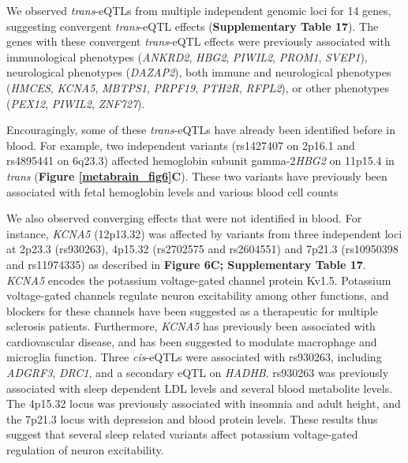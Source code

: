 We observed \textit{trans}-eQTLs from multiple independent genomic loci for 14 genes, suggesting convergent \textit{trans}-eQTL effects (\textbf{Supplementary Table 17}). The genes with these convergent \textit{trans}-eQTL effects were previously associated with immunological phenotypes (\textit{ANKRD2}, \textit{HBG2}, \textit{PIWIL2}, \textit{PROM1}, \textit{SVEP1}), neurological phenotypes (\textit{DAZAP2}), both immune and neurological phenotypes (\textit{HMCES}, \textit{KCNA5}, \textit{MBTPS1}, \textit{PRPF19}, \textit{PTH2R}, \textit{RFPL2}), or other phenotypes (\textit{PEX12}, \textit{PIWIL2}, \textit{ZNF727}). 

Encouragingly, some of these \textit{trans}-eQTLs have already been identified before in blood. For example, two independent variants (rs1427407 on 2p16.1 and rs4895441 on 6q23.3) affected hemoglobin subunit gamma-2\textit{HBG2} on 11p15.4 in \textit{trans} (\textbf{Figure \ref{metabrain_fig6}C}). These two variants have previously been associated with fetal hemoglobin levels\cite{sankaranHumanFetalHemoglobin2008,jiangCMYBInvolvedRegulation2006,metaisGenomeEditingHBG12019} and various blood cell counts

We also observed converging effects that were not identified in blood. For instance, \textit{KCNA5} (12p13.32) was affected by variants from three independent loci at 2p23.3 (rs930263), 4p15.32 (rs2702575 and rs2604551) and 7p21.3 (rs10950398 and rs11974335) as described in \textbf{Figure 6C; Supplementary Table 17}. \textit{KCNA5} encodes the potassium voltage-gated channel protein Kv1.5. Potassium voltage-gated channels regulate neuron excitability among other functions, and blockers for these channels have been suggested as a therapeutic for multiple sclerosis patients\cite{jDalfampridineBriefReview2011}. Furthermore, \textit{KCNA5} has previously been associated with cardiovascular disease\cite{al-owaisMultipleMechanismsMediating2017}, and has been suggested to modulate macrophage and microglia function\cite{rusVoltagegatedPotassiumChannel2005}. Three \textit{cis}-eQTLs were associated with rs930263, including \textit{ADGRF3}, \textit{DRC1}, and a secondary eQTL on \textit{HADHB}. rs930263 was previously associated with sleep dependent LDL levels\cite{noordamMultiancestrySleepbySNPInteraction2019} and several blood metabolite levels\cite{galloisComprehensiveStudyMetabolite2019,sunGenomicAtlasHuman2018,suhreConnectingGeneticRisk2017,tinTargetGenesVariants2019}. The 4p15.32 locus was previously associated with insomnia and adult height\cite{kichaevLeveragingPolygenicFunctional2019}, and the 7p21.3 locus with depression and blood protein levels. These results thus suggest that several sleep related variants affect potassium voltage-gated regulation of neuron excitability.  

